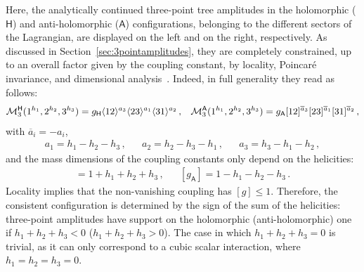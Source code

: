 \begin{subappendices}
Here, the analytically continued three-point tree amplitudes in the holomorphic ($\mathsf{H}$)
and anti-holomorphic ($\mathsf{A}$) configurations, belonging to the different sectors of the
Lagrangian, are displayed on the left and on the right, respectively.
As discussed in Section~\ref{sec:3pointamplitudes}, they are completely constrained, up to an overall factor given by the coupling constant, by
locality, Poincaré invariance, and dimensional analysis~\cite{Benincasa:2007xk}.
Indeed, in full generality they read as follows:
\begin{align}
    \mathcal M_3^\mathsf{H}(1^{h_1},2^{h_2},3^{h_3}) = g_\mathsf{H} \langle 1 2 \rangle^{a_3}\langle 2 3 \rangle^{a_1}\langle 3 1 \rangle^{a_2}\,, &&
    \mathcal M_3^\mathsf{A}(1^{h_1},2^{h_2},3^{h_3}) = g_\mathsf{A} \lbrack 1 2 \rbrack^{\overline a_3}\lbrack 2 3 \rbrack^{\overline a_1}\lbrack 3 1 \rbrack^{\overline a_2}\,,
\end{align}
with $\overline a_i=-a_i$,
\begin{align}
    a_1= h_1-h_2-h_3\,,&&
    a_2= h_2-h_3-h_1\,, &&
    a_3= h_3-h_1-h_2\,,
\end{align}
and the mass dimensions of the coupling constants only depend on the helicities:
\begin{align}
    [g_\mathsf{H}]=1+h_1+h_2+h_3\,, &&
    [g_\mathsf{A}]=1-h_1-h_2-h_3\,.
\end{align}
Locality implies that the non-vanishing coupling has $[g]\le 1$. Therefore, 
the consistent configuration is determined by the sign of the sum of the helicities: three-point amplitudes have support on the holomorphic (anti-holomorphic) one if $h_1+h_2+h_3<0$ ($h_1+h_2+h_3>0$).
The case in which $h_1+h_2+h_3=0$ is trivial, as it can only correspond to a cubic scalar
interaction, where $h_1=h_2=h_3=0$.


\end{subappendices}
